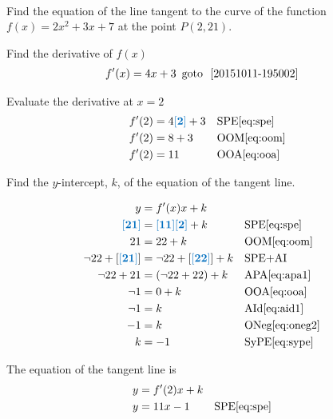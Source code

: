 \documentclass[20150903-160354-rs2.2-MarksMathNotebook.tex]{subfiles}
\begin{document}
\begin{example}[id:20151011-154209] \label{20151011-154209} \hfill \\
Find the equation of the line tangent to the curve of the function $f(x)=2x^2+3x+7$ at the point $P(2, 21)$.

\soln

\solnsteps

Find the derivative of $f(x)$
\begin{align*}
f'(x) &= 4x+3 \text{\, goto \,} \, \ref{20151011-195002}
\end{align*}

Evaluate the derivative at $x=2$
\begin{align*}
f'(2) & = 4\farg{2}+3 && \text{SPE} \eqref{eq:spe} \\
f'(2) &= 8+3 && \text{OOM} \eqref{eq:oom} \\
f'(2) &= 11 && \text{OOA} \eqref{eq:ooa} 
\end{align*}

Find the $y$-intercept, $k$, of the equation of the tangent line.

\begin{align*}
y &= f'(x)x + k\\
\farg{21} & = \farg{11}\farg{2} + k && \text{SPE} \eqref{eq:spe} \\
21 & = 22 + k && \text{OOM} \eqref{eq:oom} \\
\neg 22 + \left[\farg{21} \right] &= \neg 22 + \left[\farg{22} \right] + k && \text{SPE+AI}\\ 
\neg 22 + 21 & = (\neg 22 + 22) + k && \text{APA} \eqref{eq:apa1} \\
\neg 1 &= 0 + k && \text{OOA} \eqref{eq:ooa} \\
\neg 1 &= k && \text{AId} \eqref{eq:aid1} \\
-1 &= k && \text{ONeg} \eqref{eq:oneg2} \\
k &= -1 && \text{SyPE} \eqref{eq:sype} 
\end{align*}

The equation of the tangent line is
\begin{align*}
y & = f'(2)x+k \\
y &= 11x - 1 && \text{SPE} \eqref{eq:spe} 
\end{align*}

\end{example}
\end{document}
